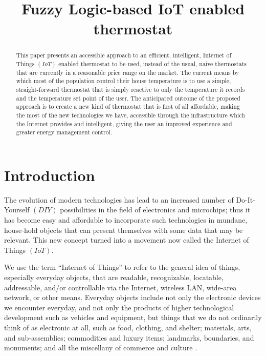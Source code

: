 \documentclass[conference]{IEEEtran}
\let\Oldsection\section
\renewcommand{\section}{\FloatBarrier\Oldsection}
\begin{document}
\title{Fuzzy Logic-based IoT enabled thermostat}


\author{
}

\maketitle


\begin{abstract}

This paper presents an accessible approach to an efficient, intelligent, Internet of Things $(IoT)$ enabled
thermostat to be used, instead of the usual, naive thermostats that are currently in a reasonable price range
on the market. The current means by which most of the population control their house temperature is to use a
simple, straight-forward thermostat that is simply reactive to only the temperature it records and the
temperature set point of the user. The anticipated outcome of the proposed approach is to create a new kind of
thermostat that is first of all affordable, making the most of the new technologies we have, accessible through
the infrastructure which the Internet provides and intelligent, giving the user an improved experience and
greater energy management control.

\end{abstract}


\section{Introduction}
\label{Introduction}

\qquad The evolution of modern technologies has lead to an increased number of Do-It-Yourself $(DIY)$ possibilities in
the field of electronics and microchips; thus it has become easy and affordable to incorporate such
technologies in mundane, house-hold objects that can present themselves with some data that may be relevant.
This new concept turned into a movement now called the Internet of Things $(IoT)$.

We use the term “Internet of Things” to refer to the general idea of things, especially everyday objects, that
are readable, recognizable, locatable, addressable, and/or controllable via the Internet,
wireless LAN, wide-area network, or other means. Everyday objects include not only the electronic devices we
encounter everyday, and not only the products of higher technological development such as vehicles and
equipment, but things that we do not ordinarily think of as electronic at all, such as food, clothing, and
shelter; materials, arts, and sub-assemblies; commodities and luxury items; landmarks, boundaries,
and monuments; and all the miscellany of commerce and culture \cite{DisruptiveCivilTechnologies}
\cite{DisruptiveCivilTechnologiesAppendix}.
\end{document}
